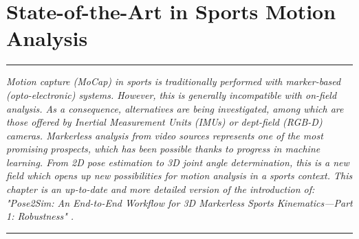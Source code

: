 
\lhead[\fancyplain{}{\leftmark}]%
      {\fancyplain{}{}} %
\chead[\fancyplain{}{}]%
      {\fancyplain{}{}}
\rhead[\fancyplain{}{}]%
      {\fancyplain{}{\rightmark}}%
\lfoot[\fancyplain{}{}]%
      {\fancyplain{}{}}
\cfoot[\fancyplain{}{\thepage}]%
      {\fancyplain{}{\thepage}} %
\rfoot[\fancyplain{}{}]%
     {\fancyplain{}{\scriptsize}}



\chapter{State-of-the-Art in Sports Motion Analysis}
\label{ch:1}


\begin{center}
\rule{0.7\linewidth}{.5pt}
\begin{minipage}{0.7\linewidth}
\smallskip

\textit{Motion capture (MoCap) in sports is traditionally performed with marker-based (opto-electronic) systems. However, this is generally incompatible with on-field analysis. As a consequence, alternatives are being investigated, among which are those offered by Inertial Measurement Units (IMUs) or dept-field (RGB-D) cameras. Markerless analysis from video sources represents one of the most promising prospects, which has been possible thanks to progress in machine learning. From 2D pose estimation to 3D joint angle determination, this is a new field which opens up new possibilities for motion analysis in a sports context.\newline \newline
This chapter is an up-to-date and more detailed version of the introduction of: "Pose2Sim: An End-to-End Workflow for 3D Markerless Sports Kinematics—Part 1: Robustness" \cite{Pagnon2021}. }

\end{minipage}
\smallskip
\rule{0.7\linewidth}{.5pt}
\end{center}

